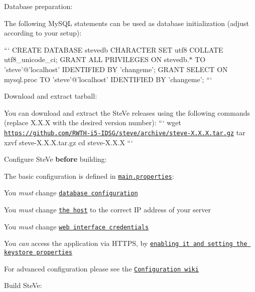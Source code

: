 \begin{DoxyEnumerate}
\item Database preparation\-:

The following My\-S\-Q\-L statements can be used as database initialization (adjust according to your setup)\-:

``` C\-R\-E\-A\-T\-E D\-A\-T\-A\-B\-A\-S\-E stevedb C\-H\-A\-R\-A\-C\-T\-E\-R S\-E\-T utf8 C\-O\-L\-L\-A\-T\-E utf8\-\_\-unicode\-\_\-ci; G\-R\-A\-N\-T A\-L\-L P\-R\-I\-V\-I\-L\-E\-G\-E\-S O\-N stevedb.$\ast$ T\-O 'steve'@'localhost' I\-D\-E\-N\-T\-I\-F\-I\-E\-D B\-Y 'changeme'; G\-R\-A\-N\-T S\-E\-L\-E\-C\-T O\-N mysql.\-proc T\-O 'steve'@'localhost' I\-D\-E\-N\-T\-I\-F\-I\-E\-D B\-Y 'changeme'; ```
\item Download and extract tarball\-:

You can download and extract the Ste\-Ve releases using the following commands (replace X.\-X.\-X with the desired version number)\-: ``` wget \href{https://github.com/RWTH-i5-IDSG/steve/archive/steve-X.X.X.tar.gz}{\tt https\-://github.\-com/\-R\-W\-T\-H-\/i5-\/\-I\-D\-S\-G/steve/archive/steve-\/\-X.\-X.\-X.\-tar.\-gz} tar xzvf steve-\/\-X.\-X.\-X.\-tar.\-gz cd steve-\/\-X.\-X.\-X ```
\item Configure Ste\-Ve {\bfseries before} building\-:

The basic configuration is defined in \href{src/main/resources/config/prod/main.properties}{\tt main.\-properties}\-:
\begin{DoxyItemize}
\item You {\itshape must} change \href{src/main/resources/config/prod/main.properties#L3-L7}{\tt database configuration}
\item You {\itshape must} change \href{src/main/resources/config/prod/main.properties#L16}{\tt the host} to the correct I\-P address of your server
\item You {\itshape must} change \href{src/main/resources/config/prod/main.properties#L11-L12}{\tt web interface credentials}
\item You {\itshape can} access the application via H\-T\-T\-P\-S, by \href{src/main/resources/config/prod/main.properties#L26-L29}{\tt enabling it and setting the keystore properties}
\end{DoxyItemize}

For advanced configuration please see the \href{https://github.com/RWTH-i5-IDSG/steve/wiki/Configuration}{\tt Configuration wiki}
\item Build Ste\-Ve\-:


\end{DoxyEnumerate}
